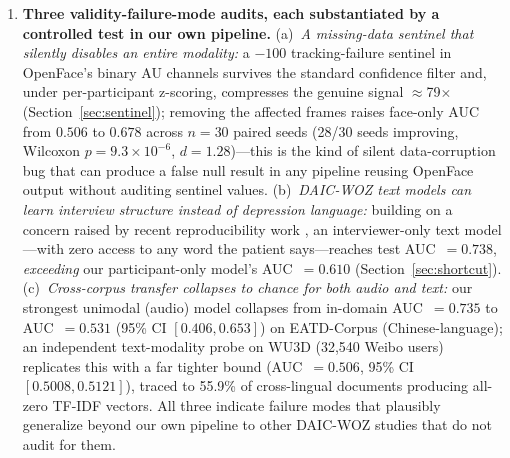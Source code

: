 \documentclass[5p,twocolumn]{elsarticle}
\begin{document}
\begin{enumerate}
  \item \textbf{Three validity-failure-mode audits, each substantiated
  by a controlled test in our own pipeline.} (a)~\emph{A missing-data
  sentinel that silently disables an entire modality:} a $-100$
  tracking-failure sentinel in OpenFace's binary AU channels survives
  the standard confidence filter and, under per-participant z-scoring,
  compresses the genuine signal $\approx$79$\times$
  (Section~\ref{sec:sentinel}); removing the affected frames raises
  face-only AUC from $0.506$ to $0.678$ across $n{=}30$ paired seeds
  (28/30 seeds improving, Wilcoxon $p{=}9.3{\times}10^{-6}$,
  $d{=}1.28$)---this is
  the kind of silent data-corruption bug that can produce a false null
  result in any pipeline reusing OpenFace output without auditing
  sentinel values. (b)~\emph{DAIC-WOZ text models can learn interview
  structure instead of depression language:} building on a concern
  raised by recent reproducibility work
  \cite{burdisso2024therapist,patapati2025invalid}, an interviewer-only
  text model---with zero access to any word the patient
  says---reaches test AUC~$=0.738$, \emph{exceeding} our
  participant-only model's AUC~$=0.610$ (Section~\ref{sec:shortcut}).
  (c)~\emph{Cross-corpus transfer collapses to chance for both audio
  and text:} our strongest unimodal (audio) model collapses from
  in-domain AUC~$=0.735$ to AUC~$=0.531$ (95\% CI $[0.406,0.653]$) on
  EATD-Corpus (Chinese-language); an independent text-modality probe
  on WU3D \cite{wang2020wu3d} (32,540 Weibo users) replicates this with
  a far tighter bound (AUC~$=0.506$, 95\% CI $[0.5008,0.5121]$), traced
  to 55.9\% of cross-lingual documents producing all-zero TF-IDF
  vectors. All three indicate failure modes that plausibly generalize
  beyond our own pipeline to other DAIC-WOZ studies that do not audit
  for them.


\end{enumerate}
\end{document}
